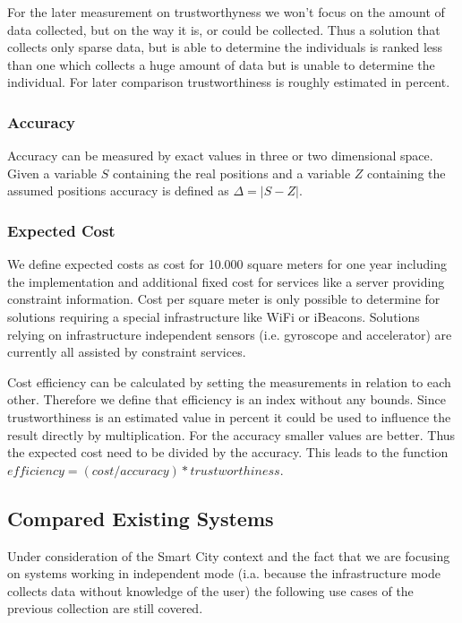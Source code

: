 For the later measurement on trustworthyness we won't focus on the amount of data collected, but on the way it is, or could be collected. 
Thus a solution that collects only sparse data, but is able to determine the individuals is ranked less than one which collects a huge amount of data but is unable to determine the individual. 
For later comparison trustworthiness is roughly estimated in percent. 

\subsubsection{Accuracy}
Accuracy can be measured by exact values in three or two dimensional space. Given a variable $S$ containing the real positions and a variable $Z$ containing the assumed positions accuracy is defined as $\Delta = |S-Z|$. 

\subsubsection{Expected Cost}
 We define expected costs as cost for 10.000 square meters for one year including the implementation and additional fixed cost for services like a server providing constraint information.  Cost per square meter is only possible to determine for solutions requiring a special infrastructure like WiFi or iBeacons.  Solutions relying on infrastructure independent sensors (i.e. gyroscope and accelerator) are currently all assisted by constraint services.
 
Cost efficiency can be calculated by setting the measurements in relation to each other. Therefore we define that efficiency is an index without any bounds. Since trustworthiness is an estimated value in percent it could be used to influence the result directly by multiplication. For the accuracy smaller values are better. Thus the expected cost need to be divided by the accuracy. This leads to the function \\ $efficiency=(cost/accuracy)*trustworthiness$.

\subsection{Compared Existing Systems}
Under consideration of the Smart City context and the fact that we are focusing on systems working in independent mode  (i.a. because the infrastructure mode collects data without knowledge of the user) the following use cases of the previous collection are still covered.

